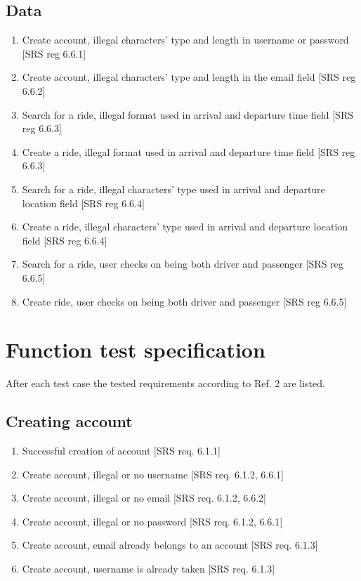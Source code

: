 \documentclass{article}
\begin{document}
\subsection{Data}

\begin{enumerate}[start=1,label={ST2.\arabic* }, leftmargin = 1.1cm, nolistsep]
\item Create account, illegal characters' type and length in username or password [SRS reg 6.6.1]
\item Create account, illegal characters' type and length in the email field [SRS reg 6.6.2]
\item Search for a ride, illegal format used in arrival and departure time field [SRS reg 6.6.3]
\item Create a ride, illegal format used in arrival and departure time field [SRS reg 6.6.3]
\item Search for a ride, illegal characters' type used in arrival and departure location field [SRS reg 6.6.4]
\item Create a ride, illegal characters' type used in arrival and departure location field [SRS reg 6.6.4]
\item Search for a ride, user checks on being both driver and passenger [SRS reg 6.6.5]
\item Create ride, user checks on being both driver and passenger [SRS reg 6.6.5]
\end{enumerate}

\newpage
\section{Function test specification}
After each test case the tested requirements according to Ref. 2 are listed.

\subsection{Creating account}

\begin{enumerate}[start=1,label={FT1.\arabic* }, leftmargin = 1.1cm, nolistsep]
\item Successful creation of account [SRS req. 6.1.1]
\item Create account, illegal or no username [SRS req. 6.1.2, 6.6.1]
\item Create account, illegal or no email [SRS req. 6.1.2, 6.6.2]
\item Create account, illegal or no password [SRS req. 6.1.2, 6.6.1]
\item Create account, email already belongs to an account [SRS req. 6.1.3]
\item Create account, username is already taken [SRS req. 6.1.3]
\end{enumerate}
\end{document}
